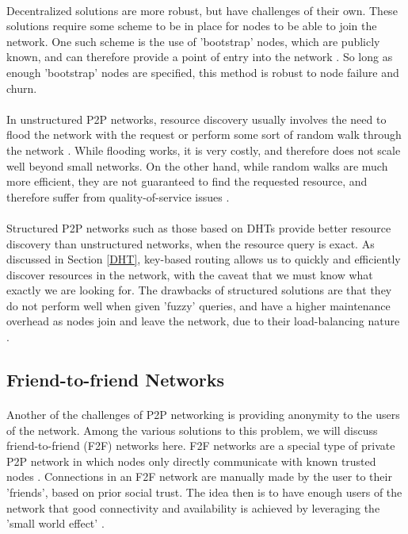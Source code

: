 \documentclass[12pt,letterpaper]{article}
\begin{document}
\paragraph{}
Decentralized solutions are more robust, but have challenges of their own.
These solutions require some scheme to be in place for nodes to be able to join the network.
One such scheme is the use of 'bootstrap' nodes, which are publicly known, and can therefore provide a point of entry into the network \cite{dht-ietf}.
So long as enough 'bootstrap' nodes are specified, this method is robust to node failure and churn.

\paragraph{}
In unstructured P2P networks, resource discovery usually involves the need to flood the network with the request or perform some sort of random walk through the network \cite{resource}\cite{resource-mobile}.
While flooding works, it is very costly, and therefore does not scale well beyond small networks.
On the other hand, while random walks are much more efficient, they are not guaranteed to find the requested resource, and therefore suffer from quality-of-service issues \cite{resource}.

\paragraph{}
Structured P2P networks such as those based on DHTs provide better resource discovery than unstructured networks, when the resource query is exact.
As discussed in Section \ref{DHT}, key-based routing allows us to quickly and efficiently discover resources in the network, with the caveat that we must know what exactly we are looking for.
The drawbacks of structured solutions are that they do not perform well when given 'fuzzy' queries, and have a higher maintenance overhead as nodes join and leave the network, due to their load-balancing nature \cite{resource}\cite{resource-mobile}.

\subsection{Friend-to-friend Networks}

\paragraph{}
Another of the challenges of P2P networking is providing anonymity to the users of the network.
Among the various solutions to this problem, we will discuss friend-to-friend (F2F) networks here.
F2F networks are a special type of private P2P network in which nodes only directly communicate with known trusted nodes \cite{wiki-f2f}.
Connections in an F2F network are manually made by the user to their 'friends', based on prior social trust.
The idea then is to have enough users of the network that good connectivity and availability is achieved by leveraging the 'small world effect' \cite{small-world}.
\end{document}
